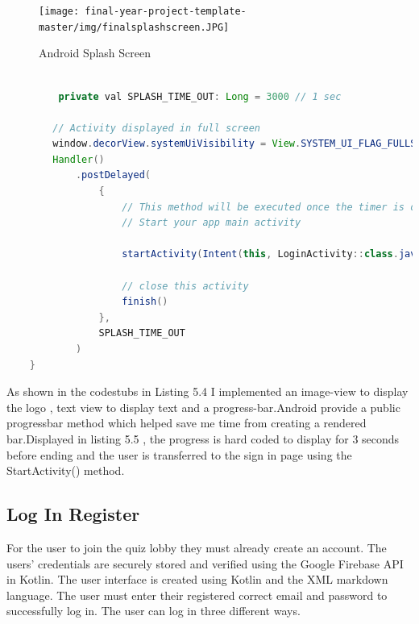   \begin{figure}[H]
  \centering
  
    \texttt{[image: final-year-project-template-master/img/finalsplashscreen.JPG]}
     \caption{Android Splash Screen}
    \end{figure}




\begin{lstlisting}[language=Java, caption=Kotlin Splash Screen codebase ]

         private val SPLASH_TIME_OUT: Long = 3000 // 1 sec
  
        // Activity displayed in full screen
        window.decorView.systemUiVisibility = View.SYSTEM_UI_FLAG_FULLSCREEN
        Handler()
            .postDelayed(
                {
                    // This method will be executed once the timer is over
                    // Start your app main activity

                    startActivity(Intent(this, LoginActivity::class.java))

                    // close this activity
                    finish()
                },
                SPLASH_TIME_OUT
            )
    }

\end{lstlisting}
As shown in the codestubs in Listing 5.4 I implemented an image-view to display the logo , text view to display text and a progress-bar.Android provide a public progressbar method  which helped save me time from creating a rendered bar.Displayed in listing 5.5 , the progress is hard coded to display for 3 seconds before ending and the user is transferred to the sign in page using the StartActivity() method.



\subsection{Log In Register}
For the user to join the quiz lobby they must already create an account. The users' credentials are securely stored and verified using the Google Firebase API in Kotlin. The user interface is created using Kotlin and the XML markdown language. The user must enter their registered correct email and password to successfully log in. The user can log in three different ways.



